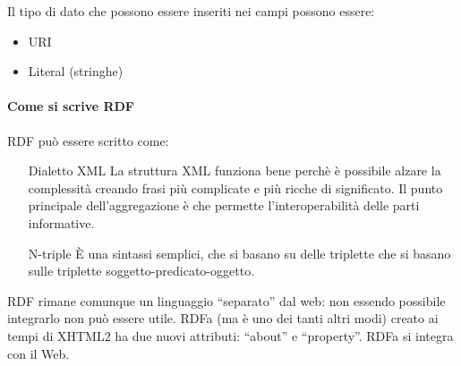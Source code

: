 Il tipo di dato che possono essere inseriti nei campi possono essere:
\begin{itemize}

\item URI
\item Literal (stringhe)

\end{itemize}

\paragraph*{Come si scrive RDF}RDF pu\`o essere scritto come:
\begin{itemize}

\item[Dialetto XML] La struttura XML funziona bene perch\`e \`e possibile alzare la complessit\`a creando frasi pi\`u complicate e pi\`u ricche di significato. Il punto principale dell'aggregazione \`e che permette l'interoperabilit\`a delle parti informative.
\item[N-triple] \`E una sintassi semplici, che si basano su delle triplette che si basano sulle triplette soggetto-predicato-oggetto.

\end{itemize}


RDF rimane comunque un linguaggio ``separato'' dal web: non essendo possibile integrarlo non pu\`o essere utile. RDFa (ma \`e uno dei tanti altri modi) creato ai tempi di XHTML2 ha due nuovi attributi: ``about'' e ``property''. RDFa si integra con il Web.

